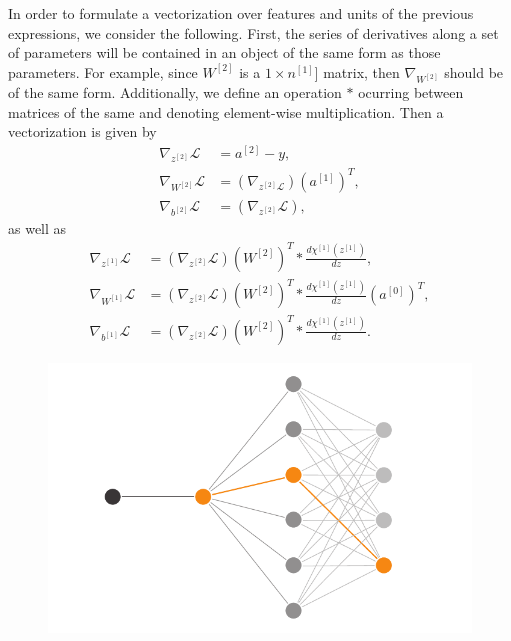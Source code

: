 \documentclass[aps,10pt]{revtex4}
\theoremstyle{plain}
\theoremstyle{definition}
\theoremstyle{remark}
\begin{document}
In order to formulate a vectorization over features and units of the previous expressions, we consider the following. First, the series of derivatives along a set of parameters will be contained in an object of the same form as those parameters. For example, since $W^{[2]}$ is a $1\times n^{[1]}]$ matrix, then $\nabla_{W^{[2]}}$ should be of the same form. Additionally, we define an operation $*$ ocurring between matrices of the same and denoting element-wise multiplication. Then a vectorization is given by
\begin{equation}\label{eqn:variation2}
 \begin{aligned}
  \nabla_{z^{[2]}}\mathcal{L} & = a^{[2]}-y, \\
  \nabla_{W^{[2]}}\mathcal{L} & = \left(\nabla_{z^{[2]}\mathcal{L}}\right)\left(a^{[1]}\right)^T, \\
  \nabla_{b^{[2]}}\mathcal{L} & = \left(\nabla_{z^{[2]}}\mathcal{L}\right),
 \end{aligned}
\end{equation}
as well as
\begin{equation}\label{eqn:variation1}
\begin{aligned}
\nabla_{z^{[1]}}\mathcal{L} &  = \left(\nabla_{z^{[2]}}\mathcal{L}\right) \left(W^{[2]}\right)^T * \frac{d\chi^{[1]}(z^{[1]})}{dz},\\ 
\nabla_{W^{[1]}}\mathcal{L} & = \left(\nabla_{z^{[2]}}\mathcal{L}\right) \left(W^{[2]}\right)^T * \frac{d\chi^{[1]}(z^{[1]})}{dz}\left(a^{[0]}\right)^T, \\
\nabla_{b^{[1]}}\mathcal{L} & = \left(\nabla_{z^{[2]}}\mathcal{L}\right) \left(W^{[2]}\right)^T * \frac{d\chi^{[1]}(z^{[1]})}{dz}.
\end{aligned}
\end{equation}

\begin{figure}[h]
	\centering
	\includegraphics[width=0.9\linewidth]{nn_2_layers_backprop}
	\caption{}
	\label{fig:nn2layersbackprop}
\end{figure}
\end{document}
